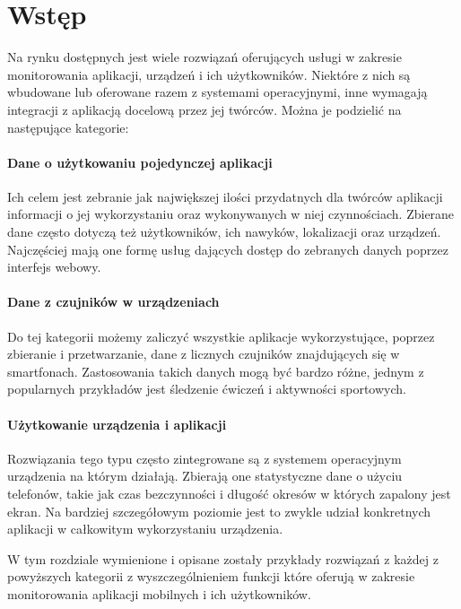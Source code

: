 \section{Wstęp}
Na rynku dostępnych jest wiele rozwiązań oferujących usługi w zakresie monitorowania aplikacji, urządzeń i ich użytkowników. Niektóre z nich są wbudowane lub oferowane razem z systemami operacyjnymi, inne wymagają integracji z aplikacją docelową przez jej twórców. Można je podzielić na następujące kategorie:

\paragraph{Dane o użytkowaniu pojedynczej aplikacji} 
Ich celem jest zebranie jak największej ilości przydatnych dla twórców aplikacji informacji o jej wykorzystaniu oraz wykonywanych w niej czynnościach. Zbierane dane często dotyczą też użytkowników, ich nawyków, lokalizacji oraz urządzeń. Najczęściej mają one formę usług dających dostęp do zebranych danych poprzez interfejs webowy. 

\paragraph{Dane z czujników w urządzeniach} 
Do tej kategorii możemy zaliczyć wszystkie aplikacje wykorzystujące, poprzez zbieranie i przetwarzanie, dane z licznych czujników znajdujących się w smartfonach. Zastosowania takich danych mogą być bardzo różne, jednym z popularnych przykładów jest śledzenie ćwiczeń i aktywności sportowych.

\paragraph{Użytkowanie urządzenia i aplikacji} 
Rozwiązania tego typu często zintegrowane są z systemem operacyjnym urządzenia na którym działają. Zbierają one statystyczne dane o użyciu telefonów, takie jak czas bezczynności i długość okresów w których zapalony jest ekran. Na bardziej szczegółowym poziomie jest to zwykle udział konkretnych aplikacji w całkowitym wykorzystaniu urządzenia.
\bigskip

W tym rozdziale wymienione i opisane zostały przykłady rozwiązań z każdej z powyższych kategorii z wyszczególnieniem funkcji które oferują w zakresie monitorowania aplikacji mobilnych i ich użytkowników.
